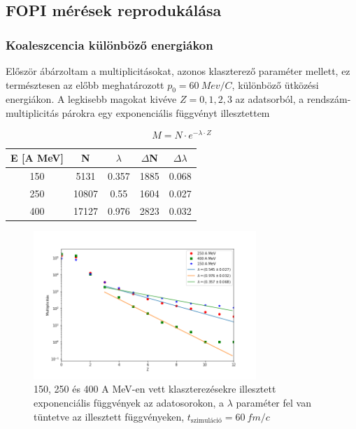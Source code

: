 \documentclass[a4paper,12pt]{article}
\begin{document}
\vspace{5mm}

\subsection{ FOPI mérések reprodukálása}

\vspace{5mm}

\subsubsection{ Koaleszcencia különböző energiákon}

\vspace{5mm}

\par Először ábárzoltam a multiplicitásokat, azonos klaszterező paraméter mellett, ez természtesen az előbb meghatározott $p_{0} = 60 ~Mev/C$, különböző ütközési energiákon. A legkisebb magokat kivéve $Z = 0, 1, 2, 3$ az adatsorból, a rendszám-multiplicitás párokra egy exponenciális függvényt illesztettem

\vspace{5mm}

\begin{equation*}
M = N\cdot e^{-\lambda\cdot Z}
\end{equation*}

\vspace{5mm}

\begin{center}
\begin{tabular}{|c|c|c|c|c|}
\hline
E [A MeV] & N & $\lambda$ & $\Delta$N & $\Delta\lambda$ \\
\hline
150 & 5131 & 0.357 & 1885 & 0.068 \\
\hline
250 & 10807 & 0.55 & 1604 & 0.027 \\
\hline
400 & 17127 & 0.976 & 2823 & 0.032 \\
\hline
\end{tabular}
\end{center}

\vspace{3mm}

\begin{figure}[!htb]
\centering
\includegraphics[width=0.75\textwidth]{./p006_250_400_fit.png}
\caption{150, 250 és 400 A MeV-en vett klaszterezésekre illesztett exponenciális függvények az adatosorokon, a $\lambda$ paraméter fel van tüntetve az illesztett függvényeken, $t_{\text{szimuláció}} = 60 ~fm/c$}
\end{figure}
\end{document}
